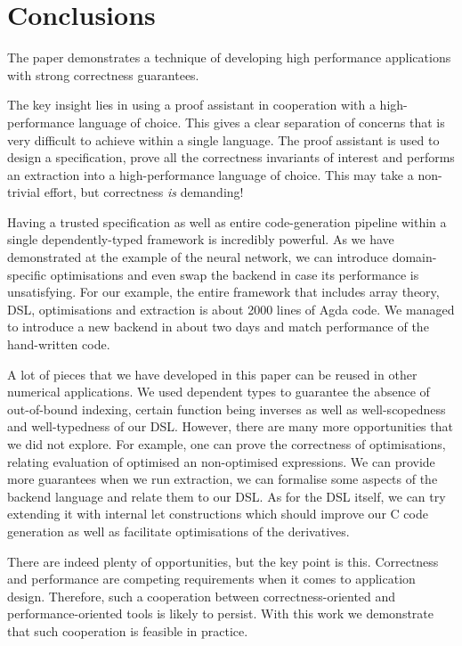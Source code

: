 \section{Conclusions\label{sec:conclusions}}

The paper demonstrates a technique of developing high performance applications with
strong correctness guarantees.

The key insight lies in using a proof assistant
in cooperation with a high-performance language of choice.  This gives a clear
separation of concerns that is very difficult to achieve within a single
language.  The proof assistant is used to design a specification, prove
all the correctness invariants of interest and performs an extraction
into a high-performance language of choice.  This may take a non-trivial
effort, but correctness \emph{is} demanding!

Having a trusted specification as well as entire code-generation pipeline
within a single dependently-typed framework is incredibly powerful.
As we have demonstrated at the example of the neural network, we can introduce domain-specific
optimisations and even swap the backend in case its performance is unsatisfying.
For our example, the entire framework that includes array theory, DSL,
optimisations and extraction is about 2000 lines of Agda code.  We managed
to introduce a new backend in about two days and match performance of
the hand-written code.

A lot of pieces that we have developed in this
paper can be reused in other numerical applications.  We used dependent
types to guarantee the absence of out-of-bound indexing, certain function being
inverses as well as well-scopedness and well-typedness of our DSL.
However, there are many more opportunities that we did not explore.
For example, one can prove the correctness of optimisations, relating
evaluation of optimised an non-optimised expressions.  We can provide
more guarantees when we run extraction, \eg{} we can formalise some
aspects of the backend language and relate them to our DSL.
As for the DSL itself, we can try extending it with internal let
constructions which should improve our C code generation as well as
facilitate optimisations of the derivatives.

There are indeed plenty of opportunities, but the key point is this.
Correctness and performance are competing requirements when it
comes to application design.  Therefore, such a cooperation between
correctness-oriented and performance-oriented tools is likely to
persist.  With this work we demonstrate that such cooperation
is feasible in practice.


